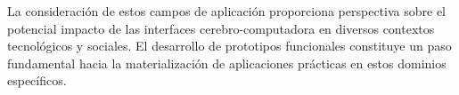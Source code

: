 La consideración de estos campos de aplicación proporciona perspectiva sobre el potencial impacto de las interfaces cerebro-computadora en diversos contextos tecnológicos y sociales. El desarrollo de prototipos funcionales constituye un paso fundamental hacia la materialización de aplicaciones prácticas en estos dominios específicos.
